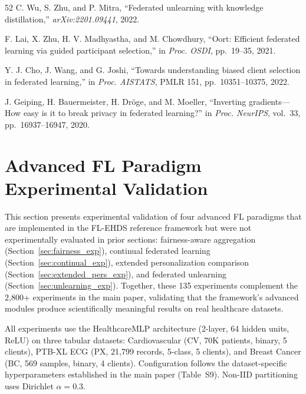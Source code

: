 \documentclass[conference,a4paper]{IEEEtran}
\begin{document}
\begin{thebibliography}{52}
C. Wu, S. Zhu, and P. Mitra, ``Federated unlearning with knowledge distillation,'' \textit{arXiv:2201.09441}, 2022.

F. Lai, X. Zhu, H. V. Madhyastha, and M. Chowdhury, ``Oort: Efficient federated learning via guided participant selection,'' in \textit{Proc. OSDI}, pp.~19--35, 2021.

Y. J. Cho, J. Wang, and G. Joshi, ``Towards understanding biased client selection in federated learning,'' in \textit{Proc. AISTATS}, PMLR 151, pp.~10351--10375, 2022.


J. Geiping, H. Bauermeister, H. Dr\"oge, and M. Moeller, ``Inverting gradients---How easy is it to break privacy in federated learning?'' in \textit{Proc. NeurIPS}, vol.~33, pp.~16937--16947, 2020.

\end{thebibliography}

\section{Advanced FL Paradigm Experimental Validation}
\label{sec:cascade4}

This section presents experimental validation of four advanced FL paradigms that are implemented in the FL-EHDS reference framework but were not experimentally evaluated in prior sections: fairness-aware aggregation (Section~\ref{sec:fairness_exp}), continual federated learning (Section~\ref{sec:continual_exp}), extended personalization comparison (Section~\ref{sec:extended_pers_exp}), and federated unlearning (Section~\ref{sec:unlearning_exp}). Together, these 135 experiments complement the 2,800+ experiments in the main paper, validating that the framework's advanced modules produce scientifically meaningful results on real healthcare datasets.

All experiments use the HealthcareMLP architecture (2-layer, 64 hidden units, ReLU) on three tabular datasets: Cardiovascular (CV, 70K patients, binary, 5 clients), PTB-XL ECG (PX, 21,799 records, 5-class, 5 clients), and Breast Cancer (BC, 569 samples, binary, 4 clients). Configuration follows the dataset-specific hyperparameters established in the main paper (Table~S9). Non-IID partitioning uses Dirichlet $\alpha{=}0.3$.
\end{document}

